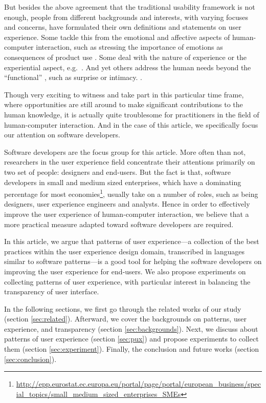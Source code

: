 \documentclass[a4paper,titlepage]{article}
\begin{document}
But besides the above agreement that the traditional usability
framework is not enough, people from different backgrounds and
interests, with varying focuses and concerns, have formulated their
own definitions and statements on user experience. Some tackle this
from the emotional and affective aspects of human-computer
interaction, such as stressing the importance of emotions as
consequences of product use \citep{emotions:desmet}. Some deal with
the nature of experience or the experiential aspect,
e.g.\ \citet{experience:forlizzi}. And yet others address the human
needs beyond the ``functional'' \citep{emotional:norman}, such as
surprise or intimacy. \citep{alternatives:gaver}.

Though very exciting to witness and take part in this particular time
frame, where opportunities are still around to make significant
contributions to the human knowledge, it is actually quite troublesome
for practitioners in the field of human-computer interaction. And in
the case of this article, we specifically focus our attention on
software developers.

Software developers are the focus group for this article. More often
than not, researchers in the user experience field concentrate their
attentions primarily on two set of people: designers and
end-users. But the fact is that, software developers in small and
medium sized enterprises, which have a dominating percentage for most
economies\footnote{\url{http://epp.eurostat.ec.europa.eu/portal/page/portal/european_business/special_topics/small_medium_sized_enterprises_SMEs}},
usually take on a number of roles, such as being designers, user
experience engineers and analysts. Hence in order to effectively
improve the user experience of human-computer interaction, we believe
that a more practical measure adapted toward software developers are
required.

In this article, we argue that patterns of user experience---a
collection of the best practices within the user experience design
domain, transcribed in languages similar to software patterns---is a
good tool for helping the software developers on improving the user
experience for end-users. We also propose experiments on collecting
patterns of user experience, with particular interest in balancing the
transparency of user interface.

In the following sections, we first go through the related works of
our study (section \ref{sec:related}). Afterward, we cover the
backgrounds on patterns, user experience, and transparency (section
\ref{sec:backgrounds}). Next, we discuss about patterns of user
experience (section \ref{sec:pux}) and propose experiments to collect
them (section \ref{sec:experiment}). Finally, the conclusion and
future works (section \ref{sec:conclusion}).
\end{document}
